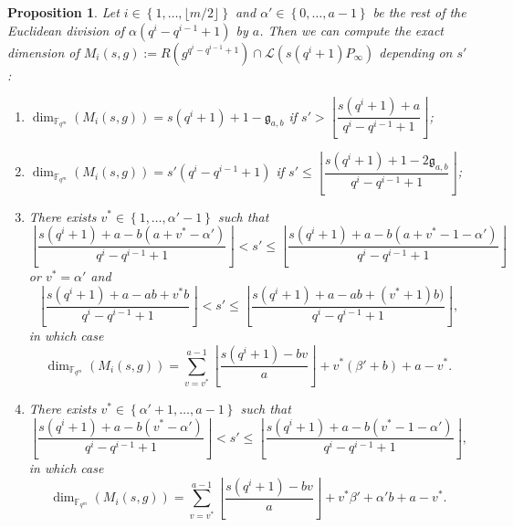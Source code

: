 \documentclass[a4paper]{article}
\newtheorem{proposition}[thm]{Proposition}
\theoremstyle{definition}
\theoremstyle{remark}
\newcommand{\calL}{\mathcal{L}}
\newcommand{\fqm}{\mathbb{F}_{q^m}}
\newcommand{\set}[1]{\left\{#1\right\}}
\begin{document}
\begin{proposition} \label{prop:dim_M_i's}
Let $i \in \set{1,\dots,\lfloor m/2 \rfloor}$ and
     $\alpha' \in \set{0,\dots,a-1}$ be the rest of the Euclidean division of $\alpha (q^i-q^{i-1}+1)$ by $a$. Then we can compute the exact dimension of $M_i(s,g) := R(g^{q^{i}-q^{i-1}+1}) \cap \calL(s(q^i+1)P_\infty)$ depending on $s'$:
    \begin{enumerate}
        \item $\dim_{\fqm}(M_i(s,g)) = s(q^i+1)+1-\mathfrak{g}_{a,b}$ if $s' > \left\lfloor \dfrac{s(q^i+1)+a}{q^i-q^{i-1}+1}\right\rfloor$;
        
        \item $\dim_{\fqm}(M_i(s,g)) = s'(q^i-q^{i-1}+1)$ if $s' \leq \left\lfloor \dfrac{s(q^i+1)+1-2\mathfrak{g}_{a,b}}{q^i-q^{i-1}+1}\right\rfloor$;
        
        \item There exists $v^* \in \set{1,\dots,\alpha'-1}$ such that
        $$ \left\lfloor \dfrac{s(q^i+1)+a-b(a+v^*-\alpha')}{q^i-q^{i-1}+1}\right\rfloor < s' \leq  \left\lfloor \dfrac{s(q^i+1)+a-b(a+v^*-1-\alpha')}{q^i-q^{i-1}+1}\right\rfloor$$ or $v^* = \alpha'$ and 
        $$\left\lfloor \dfrac{s(q^i+1)+a-ab+v^*b}{q^i-q^{i-1}+1}\right\rfloor < s' \leq  \left\lfloor \dfrac{s(q^i+1)+a-ab+(v^*+1)b)}{q^i-q^{i-1}+1}\right\rfloor,$$
        in which case 
          $$\dim_{\fqm}(M_i(s,g)) = \sum\limits_{v=v^*}^{a-1} \left\lfloor \dfrac{s(q^i+1)-bv}{a} \right\rfloor + v^*(\beta'+b) + a-v^*.$$
        
        \item There exists $v^* \in \set{\alpha'+1,\dots,a-1}$ such that
        $$ \left\lfloor \dfrac{s(q^i+1)+a-b(v^*-\alpha')}{q^i-q^{i-1}+1}\right\rfloor < s' \leq  \left\lfloor \dfrac{s(q^i+1)+a-b(v^*-1-\alpha')}{q^i-q^{i-1}+1}\right\rfloor,$$
        in which case 
        $$\dim_{\fqm}(M_i(s,g)) = \sum\limits_{v=v^*}^{a-1} \left\lfloor \dfrac{s(q^i+1)-bv}{a} \right\rfloor + v^*\beta' + \alpha'b +a-v^*.$$
    \end{enumerate}
\end{proposition}
\end{document}
